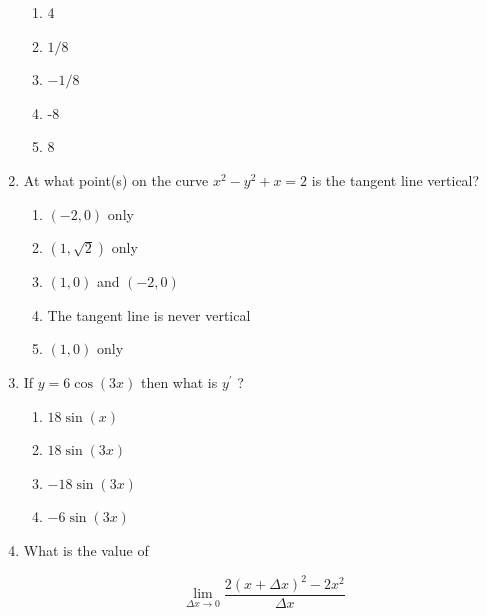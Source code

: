 \documentclass{article}
\begin{document}
\begin{enumerate}
\begin{minipage}[t]{\linewidth}
		\vspace{1em}

		\begin{enumerate}
		\setlength\itemsep{2em}
			\item  4 
			\item  $1 / 8$ 
			\item  $-1 / 8$ 
			\item  -8 
			\item  8 
		\end{enumerate}
	\end{minipage}
	\item
	\begin{minipage}[t]{\linewidth}
		At what point(s) on the curve \(x^{2}-y^{2}+x=2\) is the tangent line
vertical?


		\vspace{1em}

		\begin{enumerate}
		\setlength\itemsep{2em}
			\item  $(-2,0)$ only 
			\item  $(1, \sqrt{2})$ only 
			\item  $(1,0)$ and $(-2,0)$ 
			\item  The tangent line is never vertical 
			\item  $(1,0)$ only 
		\end{enumerate}
	\end{minipage}
	\item
	\begin{minipage}[t]{\linewidth}
		If \(y=6 \cos (3 x)\) then what is \(y^{\prime}\) ?


		\vspace{1em}

		\begin{enumerate}
		\setlength\itemsep{2em}
			\item  $18 \sin (x)$ 
			\item  $18 \sin (3 x)$ 
			\item  $-18 \sin (3 x)$ 
			\item  $-6 \sin (3 x)$ 
		\end{enumerate}
	\end{minipage}
	\item
	\begin{minipage}[t]{\linewidth}
		What is the value of

\[
\lim _{\Delta x \rightarrow 0} \frac{2(x+\Delta x)^{2}-2 x^{2}}{\Delta x}
\]


		\vspace{1em}


\end{minipage}
\end{enumerate}
\end{document}
